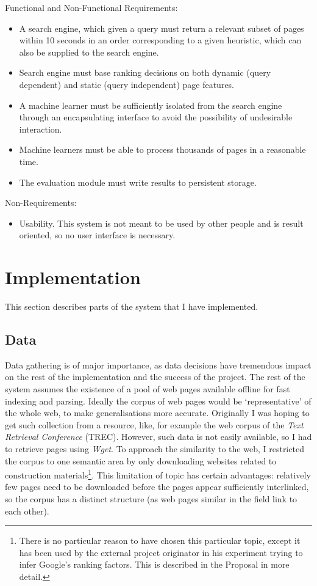 \documentclass[12pt,notitlepage,twoside]{scrreprt}
\begin{document}
Functional and Non-Functional Requirements:
\begin{itemize}
  \item{A search engine, which given a query must return a relevant subset of
      pages within 10 seconds in an order corresponding to a given heuristic, which can also be
  supplied to the search engine.}
  \item{Search engine must base ranking decisions on both dynamic
      (query dependent) and static (query independent)
    page features.}
  \item{A machine learner must be sufficiently isolated from the search engine
    through an encapsulating interface to avoid the possibility of undesirable interaction.}
  \item{Machine learners must be able to process thousands of pages in a
    reasonable time.}
  \item{The evaluation module must write results to persistent storage.}
\end{itemize}
Non-Requirements:
\begin{itemize}
  \item{Usability. This system is not meant to be used by other people and is result
    oriented, so no user interface is necessary.}
\end{itemize}
\cleardoublepage
\chapter{Implementation}
This section describes parts of the system that I have implemented.

\section{Data}
Data gathering is of major importance, as data decisions have tremendous impact
on the rest of the implementation and the success of the project. The rest of
the system assumes the existence of a pool of web pages available offline for
fast indexing and parsing. Ideally the corpus of web pages would be
`representative' of the whole web, to make generalisations more accurate.
Originally I was hoping to get such collection from a resource, like, for
example the web corpus of the \textit{Text Retrieval Conference} (TREC). However,
such data is not easily available, so I had to retrieve pages using
\textit{Wget}. To approach the similarity to the web, I restricted the corpus
to one semantic area by only downloading websites related to construction
materials\footnote{There is no particular reason to have chosen this particular
topic, except it has been used by the external project originator in his
experiment trying to infer Google's ranking factors. This is described in the
Proposal in more detail.}. This limitation of topic has certain advantages:
relatively few pages need to be  downloaded before the pages appear
sufficiently interlinked, so the corpus has a distinct structure (as web pages
similar in the field link to each other).
\end{document}

